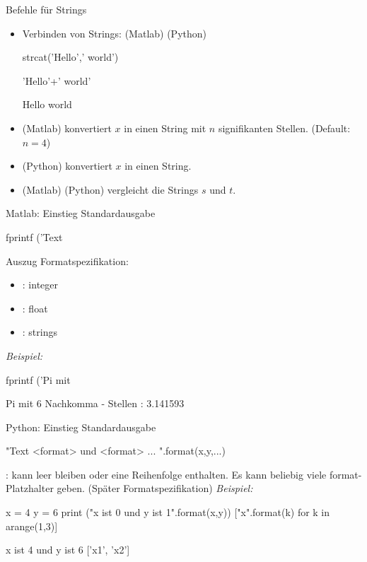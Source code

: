 \documentclass[hyperref={xetex}]{beamer}
\begin{document}
%
%
\begin{frame}[fragile]{Befehle für Strings}
\begin{itemize}
\item Verbinden von Strings: (Matlab) \isage{+}(Python)  
\begin{matlabin}
strcat('Hello',' world') 
\end{matlabin}
\begin{pyin}
'Hello'+' world'
\end{pyin}
\begin{matlab}
Hello world 
\end{matlab}
\item {}(Matlab) konvertiert $x$ in einen String mit $n$
  signifikanten Stellen. (Default: $n=4$)
\item {}(Python) konvertiert $x$ in einen String.
\item {}(Matlab) (Python) vergleicht die Strings $s$ und $t$. 
\end{itemize}
\end{frame}

\begin{frame}[fragile]{Matlab: Einstieg Standardausgabe}
\begin{matlabin}
fprintf ('Text %
\end{matlabin}
Auszug Formatspezifikation:
\begin{itemize}
\item  {} : integer
\item {} : float
\item {} : strings
\end{itemize}
\emph{Beispiel:}
\begin{matlabin}
fprintf ('Pi mit %
\end{matlabin}
\begin{matlab}
Pi mit 6 Nachkomma - Stellen : 3.141593
\end{matlab}
\end{frame}


\begin{frame}[fragile]{Python: Einstieg Standardausgabe}
\begin{pyin}
"Text {<format>} und {<format>} ... ".format(x,y,...)
\end{pyin}
  : kann leer bleiben oder eine Reihenfolge enthalten.  Es kann beliebig viele format-Platzhalter geben. (Später Formatspezifikation)
\emph{Beispiel:}
\begin{pyin}
x = 4
y = 6
print ("x ist {0} und y ist {1}".format(x,y))
["x{}".format(k) for k in arange(1,3)]
\end{pyin}
\begin{pyout}
x ist 4 und y ist 6
['x1', 'x2']
\end{pyout}

\end{frame}
         
\end{document}
